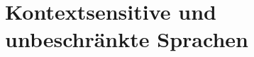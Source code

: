 \documentclass{lehramt-informatik-haupt}
\begin{document}

\chapter{Kontextsensitive und unbeschränkte Sprachen}

\literatur
\end{document}
